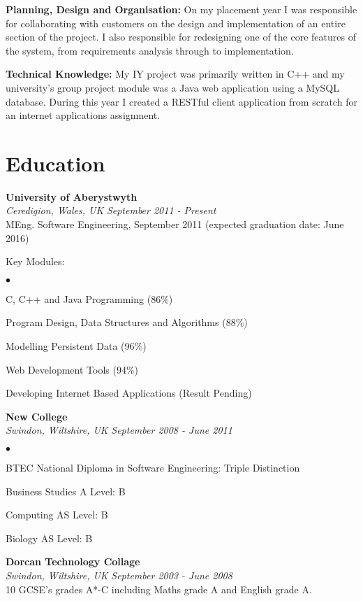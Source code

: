 \documentclass[margin,line]{res}
\newenvironment{list2}{
  \begin{list}{$\bullet$}{%
      \setlength{\itemsep}{0in}
      \setlength{\parsep}{0in} \setlength{\parskip}{0in}
      \setlength{\topsep}{0in} \setlength{\partopsep}{0in}
      \setlength{\leftmargin}{0.2in}}}{\end{list}}
\begin{document}
\begin{resume}
{\bf Planning, Design and Organisation:} On my placement year I was responsible for collaborating with customers on the design and implementation of an entire section of the project. I also responsible for redesigning one of the core features of the system, from requirements analysis through to implementation.

{\bf Technical Knowledge:} My IY project was primarily written in C++ and my university's group project module was a Java web application using a MySQL database. During this year I created a RESTful client application from scratch for an internet applications assignment.

\section{\sc Education}
{\bf University of Aberystwyth}\\
{\it Ceredigion, Wales, UK} \hfill {\it September 2011 - Present}\\
MEng. Software Engineering, September 2011 (expected graduation date: June 2016)

Key Modules:
\begin{list2}

\item C, C++ and Java Programming (86\%)
\item Program Design, Data Structures and Algorithms (88\%)
\item Modelling Persistent Data (96\%)
\item Web Development Tools (94\%)
\item Developing Internet Based Applications (Result Pending)
\end{list2}

{\bf New College}\\
{\it Swindon, Wiltshire, UK} \hfill {\it September 2008 - June 2011}
\begin{list2}
\item BTEC National Diploma in Software Engineering: Triple Distinction
\item Business Studies A Level: B
\item Computing AS Level: B
\item Biology AS Level: B
\end{list2}

\newpage
{\bf Dorcan Technology Collage} \\
{\it Swindon, Wiltshire, UK} \hfill {\it September 2003 - June 2008}\\
10 GCSE's grades A*-C including Maths grade A and English grade A.


\end{resume}
\end{document}
